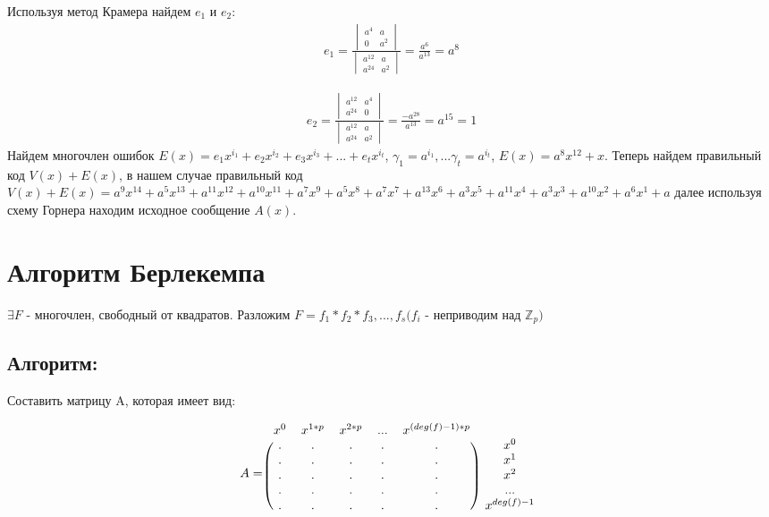\documentclass[12pt]{article}
\begin{document}
Используя метод Крамера найдем $e_{1}$ и $e_{2}$:
\begin{gather}
    e_{1}
    =
    \frac{
        \begin{vmatrix}
            a^{4} & a     \\
            0     & a^{2}
        \end{vmatrix}
    }
    {
        \begin{vmatrix}
            a^{12} & a     \\
            a^{24} & a^{2}
        \end{vmatrix}
    }
    =
    \frac{a^{6}}{a^{13}}
    =
    a^{8}
\end{gather}

\begin{gather}
    e_{2}
    =
    \frac{
        \begin{vmatrix}
            a^{12} & a^4 \\
            a^{24} & 0
        \end{vmatrix}
    }
    {
        \begin{vmatrix}
            a^{12} & a     \\
            a^{24} & a^{2}
        \end{vmatrix}
    }
    =
    \frac{-a^{28}}{a^{13}}
    =
    a^{15}
    =
    1
\end{gather}
Найдем многочлен ошибок $E(x) = e_{1}x^{i_{1}} + e_{2}x^{i_{2}} + e_{3}x^{i_{3}} + ... + e_{t}x^{i_{t}}$, $\gamma_{1} = a^{i_{1}}, ... \gamma_{t} = a^{i_{t}} $, $E(x) = a^{8}x^{12} + x$.
Теперь найдем правильный код $V(x) + E(x)$, в нашем случае правильный код $V(x) + E(x) = a^{9}x^{14} + a^{5}x^{13} + a^{11}x^{12} + a^{10}x^{11} + a^{7}x^{9} + a^{5}x^{8} + a^{7}x^{7} + a^{13}x^{6} + a^{3}x^{5} + a^{11}x^{4} + a^{3}x^{3} + a^{10}x^{2} + a^{6}x^{1} + a$ далее используя схему Горнера находим исходное сообщение $A(x)$.

\section{Алгоритм Берлекемпа}
$\exists F$ - многочлен, свободный от квадратов. Разложим $F = f_1 * f_2 * f_3, ..., f_s (f_i$ - неприводим над $\mathbb{Z}_p )$
\subsection {Алгоритм:}
Составить матрицу A, которая имеет вид:

\[
    A =
    \begin{blockarray}{cccccc}
        x^0 & x^{1*p} & x^{2*p} & ... & x^{(deg(f) - 1)*p} \\
        \begin{block}{(ccccc)c}
            . & . & . & . & . & x^0 \\
            . & . & . & . & . & x^1 \\
            . & . & . & . & . & x^2 \\
            . & . & . & . & . & ... \\
            . & . & . & . & . & x^{deg(f)-1} \\
        \end{block}
    \end{blockarray}
\]
\end{document}
